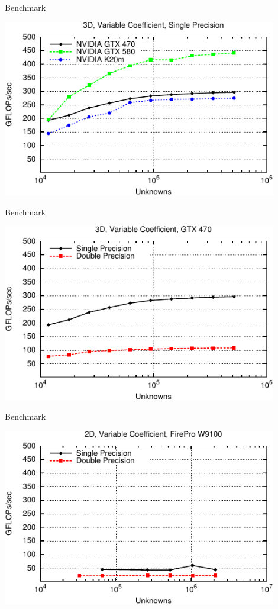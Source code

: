 \begin{frame}{Benchmark}
 \begin{center}
  \includegraphics[width=0.9\textwidth]{figures/3d_variable_float-crop}
 \end{center}
\end{frame}

\begin{frame}{Benchmark}
 \begin{center}
  \includegraphics[width=0.9\textwidth]{figures/3d_variable-crop}
 \end{center}
\end{frame}

\begin{frame}{Benchmark}
 \begin{center}
  \includegraphics[width=0.9\textwidth]{figures/amd_2d_variable-crop}
 \end{center}
\end{frame}

